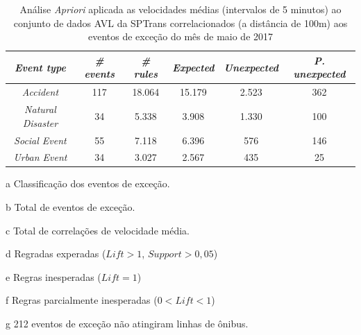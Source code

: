 \documentclass[
	12pt,				%
	oneside,			%
	a4paper,			%
	english,			%
	brazil				%
	]{abntex2ppgsi}
\begin{document}
\begin{apendicesenv}
\begin{table}[!htb]
\centering
\begin{threeparttable}
\caption {Análise \textit{Apriori} aplicada as velocidades médias (intervalos de 5 minutos) ao conjunto de dados AVL da SPTrans correlacionados (a distância de 100m) aos eventos de exceção do mês de maio de 2017}
\label {tab:aprioriFull}
\begin{tabular}{c|c|c|c|c|c}
\hline
\textbf{\textit{Event type}}\tnote{a} & \textbf{\textit{\# events}}\tnote{b} & \textit{\textbf{\# rules}}\tnote{c} & \textbf{\textit{Expected}}\tnote{d} & \textbf{\textit{Unexpected}}\tnote{e} & \textbf{\textit{P. unexpected}}\tnote{f}   \\
\hline
\textit{Accident} & 117 & 18.064 & 15.179 & 2.523 & 362 \\
\textit{Natural Disaster} & 34 & 5.338 & 3.908 & 1.330 & 100 \\
\textit{Social Event} & 55 & 7.118 & 6.396 & 576 & 146 \\
\textit{Urban Event} & 34 & 3.027 & 2.567 & 435 & 25 \\
\hline
\end{tabular}
\begin{tablenotes}
            \item[a] Classificação dos eventos de exceção.
            \item[b] Total de eventos de exceção.
            \item[c] Total de correlações de velocidade média.
            \item[d] Regradas experadas ($Lift > 1$, $Support > 0,05$)
            \item[e] Regras inesperadas ($Lift = 1$)
            \item[f] Regras parcialmente inesperadas ($0 < Lift < 1$)
            \item[g] 212 eventos de exceção não atingiram linhas de ônibus.
        \end{tablenotes}
\end{threeparttable}
\end{table}



\end{apendicesenv}
\end{document}
